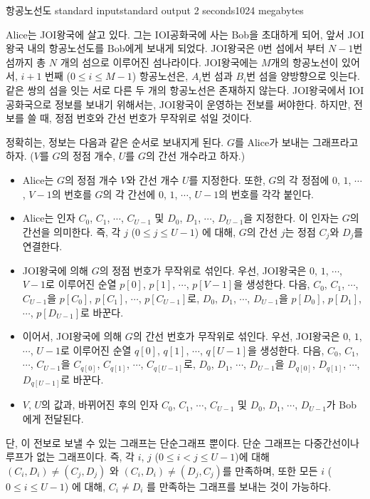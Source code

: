 \begin{problem}{항공노선도}
	{standard input}{standard output}
	{2 seconds}{1024 megabytes}{}
	
	Alice는 JOI왕국에 살고 있다. 그는 IOI공화국에 사는 Bob을 초대하게 되어, 앞서 JOI왕국 내의 항공노선도를 Bob에게 보내게 되었다. JOI왕국은 0번 섬에서 부터 $N-1$번 섬까지 총 $N$ 개의 섬으로 이루어진 섬나라이다. JOI왕국에는 $M$개의 항공노선이 있어서, $i+1$ 번째 ($0 \le i \le M-1$) 항공노선은, $A_i$번 섬과 $B_i$번 섬을 양방향으로 잇는다. 같은 쌍의 섬을 잇는 서로 다른 두 개의 항공노선은 존재하지 않는다. JOI왕국에서 IOI공화국으로 정보를 보내기 위해서는, JOI왕국이 운영하는 전보를 써야한다. 하지만, 전보를 쓸 때, 정점 번호와 간선 번호가 무작위로 섞일 것이다.
	
	정확히는, 정보는 다음과 같은 순서로 보내지게 된다. $G$를 Alice가 보내는 그래프라고 하자. ($V$를 $G$의 정점 개수, $U$를 $G$의 간선 개수라고 하자.)
	
	\begin{itemize}
		\item Alice는 $G$의 정점 개수 $V$와 간선 개수 $U$를 지정한다. 또한, $G$의 각 정점에 $0$, $1$, $\cdots$, $V-1$의 번호를 $G$의 각 간선에 $0$, $1$, $\cdots$, $U-1$의 번호를 각각 붙인다.
		\item Alice는 인자 $C_0$, $C_1$, $\cdots$, $C_{U-1}$ 및 $D_0$, $D_1$, $\cdots$, $D_{U-1}$을 지정한다. 이 인자는 $G$의 간선을 의미한다. 즉, 각 $j$ ($0 \le j \le U-1$) 에 대해, $G$의 간선 $j$는 정점 $C_j$와 $D_j$를 연결한다.
		\item JOI왕국에 의해 $G$의 정점 번호가 무작위로 섞인다. 우선, JOI왕국은 $0$, $1$, $\cdots$, $V-1$로 이루어진 순열 $p[0]$, $p[1]$, $\cdots$, $p[V-1]$을 생성한다. 다음, $C_0$, $C_1$, $\cdots$, $C_{U-1}$을 $p[C_0]$, $p[C_1]$, $\cdots$, $p[C_{U-1}]$로, $D_0$, $D_1$, $\cdots$, $D_{U-1}$을 $p[D_0]$, $p[D_1]$, $\cdots$, $p[D_{U-1}]$로 바꾼다.
		\item 이어서, JOI왕국에 의해 $G$의 간선 번호가 무작위로 섞인다. 우선, JOI왕국은 $0$, $1$, $\cdots$, $U-1$로 이루어진 순열 $q[0]$, $q[1]$, $\cdots$, $q[U-1]$을 생성한다. 다음, $C_0$, $C_1$, $\cdots$, $C_{U-1}$을 $C_{q[0]}$, $C_{q[1]}$, $\cdots$, $C_{q[U-1]}$로, $D_0$, $D_1$, $\cdots$, $D_{U-1}$을 $D_{q[0]}$, $D_{q[1]}$, $\cdots$, $D_{q[U-1]}$로 바꾼다.
		\item $V$, $U$의 값과, 바뀌어진 후의 인자 $C_0$, $C_1$, $\cdots$, $C_{U-1}$ 및 $D_0$, $D_1$, $\cdots$, $D_{U-1}$가 Bob에게 전달된다.
	\end{itemize}

	단, 이 전보로 보낼 수 있는 그래프는 단순그래프 뿐이다. 단순 그래프는 다중간선이나 루프가 없는 그래프이다. 즉, 각 $i$, $j$ ($0 \le i < j \le U-1$)에 대해 $(C_i, D_i) \ne (C_j, D_j)$ 와 $(C_i, D_i) \ne (D_j, C_j)$를 만족하며, 또한 모든 $i$ ($0 \le i \le U-1$) 에 대해, $C_i \ne D_i$ 를 만족하는 그래프를 보내는 것이 가능하다.
	

\end{problem}
